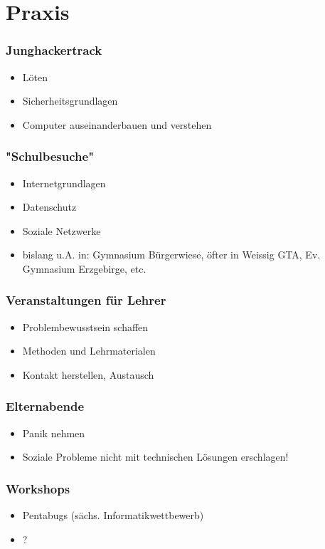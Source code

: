 \documentclass[12pt]{beamer}
\begin{document}
\section{Praxis}

\begin{frame}
  \frametitle{Junghackertrack}
  \begin{itemize}
    \item Löten
    \item Sicherheitsgrundlagen
    \item Computer auseinanderbauen und verstehen
  \end{itemize}
\end{frame}

\begin{frame}
  \frametitle{"Schulbesuche"}
  \begin{itemize}
    \item Internetgrundlagen
    \item Datenschutz
    \item Soziale Netzwerke
    \item bislang u.A. in: Gymnasium Bürgerwiese, öfter in Weissig GTA, Ev. Gymnasium Erzgebirge, etc.
  \end{itemize}
\end{frame}

\begin{frame}
  \frametitle{Veranstaltungen für Lehrer}
  \begin{itemize}
    \item Problembewusstsein schaffen
    \item Methoden und Lehrmaterialen
    \item Kontakt herstellen, Austausch
  \end{itemize}
\end{frame}

\begin{frame}
  \frametitle{Elternabende}
  \begin{itemize}
    \item Panik nehmen
    \item Soziale Probleme nicht mit technischen Lösungen erschlagen!
  \end{itemize}
\end{frame}

\begin{frame}
  \frametitle{Workshops}
  \begin{itemize}
    \item Pentabugs (sächs. Informatikwettbewerb)
    \item ?
  \end{itemize}
\end{frame}
\end{document}
